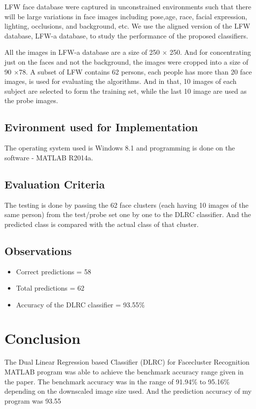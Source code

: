 \documentclass[a4paper]{article}
\begin{document}
		LFW face database were captured in unconstrained environments
		such that there will be large variations in face images
		including pose,age, race, facial expression, lighting,
		occlusions, and background, etc. We use the aligned version
		of the LFW database, LFW-a database, to study the
		performance of the proposed classifiers. 
		
		All the
		images in LFW-a database are a size of 250 ${\times}$ 250. And for concentrating just on the faces and not the background, the images were cropped into
		a size of 90 ${\times}$78. A subset of LFW contains 62 persons,
		each people has more than 20 face images, is used for
		evaluating the algorithms. And in that, 10 images of each subject
		are selected to form the training set, while the last 10 image
		are used as the probe images.
		
		\subsection{Evironment used for Implementation}
		
		The operating system used is Windows 8.1  and programming is done on the software - MATLAB R2014a. 
		
				
		
			
			
			\subsection{Evaluation Criteria}
			The testing is done by passing the 62 face clusters (each having 10 images of the same person) from the test/probe set one by one to the DLRC classifier. And the predicted class is compared with the actual class of that cluster.
			
			\subsection{Observations}
			
			\begin{itemize}
				\item Correct predictions = 	58
				
				\item Total predictions		= 	62
				
				\item Accuracy of the DLRC classifier	=	93.55\%
			\end{itemize}
	
	\section{Conclusion}
						
			The Dual Linear Regression based Classifier (DLRC) for Facecluster Recognition MATLAB program was able to achieve the benchmark accuracy range given in the paper. The benchmark accuracy was in the range of 91.94\% to 95.16\% depending on the downscaled image size used. And the prediction accuracy of my program was 93.55%
			
				
	
	
\end{document}
